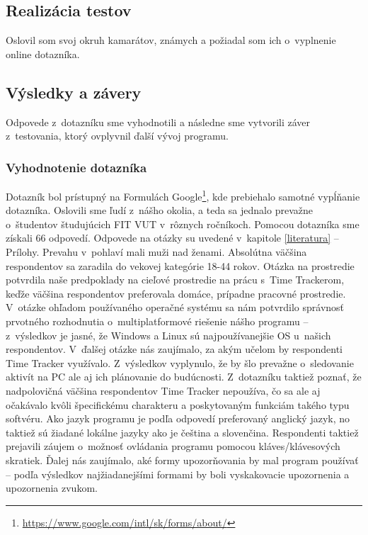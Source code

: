 \documentclass[]{article}
\begin{document}
\subsection{Realizácia testov}
Oslovil som svoj okruh kamarátov, známych a požiadal som ich o~vyplnenie online dotazníka. 

\subsection{Výsledky a závery}

Odpovede z~dotazníku sme vyhodnotili a následne sme vytvorili záver z~testovania, ktorý ovplyvnil ďalší vývoj programu.

\subsubsection{Vyhodnotenie dotazníka}

Dotazník bol prístupný na Formulách Google\footnote{\url{https://www.google.com/intl/sk/forms/about/}}, kde prebiehalo samotné vypĺňanie dotazníka. Oslovili sme ľudí z~nášho okolia, a teda sa jednalo prevažne o~študentov študujúcich FIT VUT v~rôznych ročníkoch. Pomocou dotazníka sme získali 66 odpovedí. Odpovede na otázky su uvedené v~kapitole \ref{literatura} -- Prílohy. Prevahu v~pohlaví mali muži nad ženami. Absolútna väčšina respondentov sa zaradila do vekovej kategórie 18-44 rokov. Otázka na prostredie potvrdila naše predpoklady na cieľové prostredie na prácu s~Time Trackerom, keďže väčšina respondentov preferovala domáce, prípadne pracovné prostredie. V~otázke ohľadom používaného operačné systému sa nám potvrdilo správnosť prvotného rozhodnutia o~multiplatformové riešenie nášho programu – z~výsledkov je jasné, že Windows a Linux sú najpoužívanejšie OS u~našich respondentov. V~ďalšej otázke nás zaujímalo, za akým učelom by respondenti Time Tracker využívalo. Z~výsledkov vyplynulo, že by šlo prevažne o~sledovanie aktivít na PC ale aj ich plánovanie do budúcnosti. Z~dotazníku taktiež  poznať, že nadpolovičná väčšina respondentov Time Tracker nepoužíva, čo sa ale aj očakávalo kvôli špecifickému charakteru a poskytovaným funkciám takého typu softvéru. Ako jazyk programu je podľa odpovedí preferovaný anglický jazyk, no taktiež sú žiadané lokálne jazyky ako je čeština a slovenčina. Respondenti taktiež prejavili záujem o~možnosť ovládania programu pomocou kláves/klávesových skratiek. Ďalej nás zaujímalo, aké formy upozorňovania by mal program používať – podľa výsledkov najžiadanejšími formami by boli vyskakovacie upozornenia a upozornenia zvukom.
\end{document}
